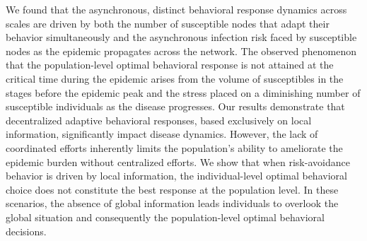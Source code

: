 \documentclass[9pt,twocolumn,twoside]{pnas-new}
\begin{document}
We found that the asynchronous, distinct behavioral response dynamics across scales are driven by both the number of susceptible nodes that adapt their behavior simultaneously and the asynchronous infection risk faced by susceptible nodes as the epidemic propagates across the network.
The observed phenomenon that the population-level optimal behavioral response is not attained at the critical time during the epidemic arises from the volume of susceptibles in the stages before the epidemic peak and the stress placed on a diminishing number of susceptible individuals as the disease progresses.
%
Our results demonstrate that decentralized adaptive behavioral responses, based exclusively on local information, significantly impact disease dynamics. However, the lack of coordinated efforts inherently limits the population's ability to ameliorate the epidemic burden without centralized efforts.
%
We show that when risk-avoidance behavior is driven by local information, the individual-level optimal behavioral choice does not constitute the best response at the population level. In these scenarios, the absence of global information leads individuals to overlook the global situation and consequently the population-level optimal behavioral decisions.
\end{document}
